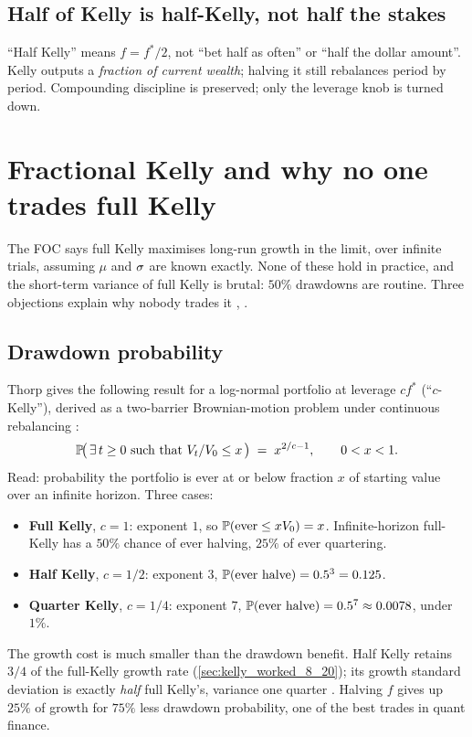 \subsection{Half of Kelly is half-Kelly, not half the stakes}

``Half Kelly'' means $f = f^{*}/2$, not ``bet half as often'' or
``half the dollar amount''. Kelly outputs a \emph{fraction of
current wealth}; halving it still rebalances period by period.
Compounding discipline is preserved; only the leverage knob is
turned down.

\section{Fractional Kelly and why no one trades full Kelly}
\label{sec:fractional_kelly}

The FOC says full Kelly maximises long-run growth in the
limit, over infinite trials, assuming $\mu$ and $\sigma$ are known
exactly. None of these hold in practice, and the short-term
variance of full Kelly is brutal: $50\%$ drawdowns are routine.
Three objections explain why nobody trades it \citeThorp, \citeChan.

\subsection{Drawdown probability}

Thorp gives the following result for a log-normal portfolio at
leverage $c f^{*}$ (``$c$-Kelly''), derived as a two-barrier
Brownian-motion problem under continuous rebalancing \citeThorp:
\begin{equation}
  \mathbb{P}\!\bigl(\,\exists\, t\geq 0\text{ such that }
  V_t/V_0 \leq x\,\bigr) \;=\; x^{2/c - 1},
  \qquad 0 < x < 1.
  \label{eq:thorp_drawdown}
\end{equation}
Read: probability the portfolio is ever at or below fraction $x$
of starting value over an infinite horizon. Three cases:
\begin{itemize}
  \item \textbf{Full Kelly}, $c = 1$: exponent $1$, so
  $\mathbb{P}(\text{ever} \leq x V_0) = x$. Infinite-horizon full-Kelly
  has a $50\%$ chance of ever halving, $25\%$ of ever quartering.
  \item \textbf{Half Kelly}, $c = 1/2$: exponent $3$,
  $\mathbb{P}(\text{ever halve}) = 0.5^3 = 0.125$.
  \item \textbf{Quarter Kelly}, $c = 1/4$: exponent $7$,
  $\mathbb{P}(\text{ever halve}) = 0.5^7 \approx 0.0078$, under $1\%$.
\end{itemize}
The growth cost is much smaller than the drawdown benefit. Half
Kelly retains $3/4$ of the full-Kelly growth rate
(\cref{sec:kelly_worked_8_20}); its growth standard deviation is
exactly \emph{half} full Kelly's, variance one quarter
\citeThorp. Halving $f$ gives up $25\%$ of growth for $75\%$ less
drawdown probability, one of the best trades in quant finance.

